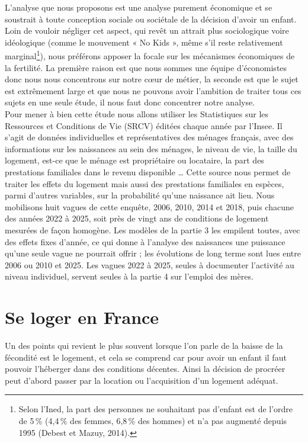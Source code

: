 \documentclass[12pt,a4paper]{article}
\begin{document}
\noindent L’analyse que nous proposons est une analyse purement économique et se soustrait à toute conception sociale ou sociétale de la décision d’avoir un enfant. Loin de vouloir négliger cet aspect, qui revêt un attrait plus sociologique voire idéologique (comme le mouvement « No Kids », même s’il reste relativement marginal\footnote{Selon l’Ined, la part des personnes ne souhaitant pas d’enfant est de l’ordre de 5\,\% (4,4\,\% des femmes, 6,8\,\% des hommes) et n’a pas augmenté depuis 1995 (Debest et Mazuy, 2014).}), nous préférons apposer la focale sur les mécanismes économiques de la fertilité. La première raison est que nous sommes une équipe d’économistes donc nous nous concentrons sur notre cœur de métier, la seconde est que le sujet est extrêmement large et que nous ne pouvons avoir l’ambition de traiter tous ces sujets en une seule étude, il nous faut donc concentrer notre analyse. \\

\noindent Pour mener à bien cette étude nous allons utiliser les Statistiques sur les Ressources et Conditions de Vie (SRCV) éditées chaque année par l’Insee. Il s’agit de données individuelles et représentatives des ménages français, avec des informations sur les naissances au sein des ménages, le niveau de vie, la taille du logement, est-ce que le ménage est propriétaire ou locataire, la part des prestations familiales dans le revenu disponible … Cette source nous permet de traiter les effets du logement mais aussi des prestations familiales en espèces, parmi d’autres variables, sur la probabilité qu’une naissance ait lieu. Nous mobilisons huit vagues de cette enquête, 2006, 2010, 2014 et 2018, puis chacune des années 2022 à 2025, soit près de vingt ans de conditions de logement mesurées de façon homogène. Les modèles de la partie 3 les empilent toutes, avec des effets fixes d’année, ce qui donne à l’analyse des naissances une puissance qu’une seule vague ne pourrait offrir ; les évolutions de long terme sont lues entre 2006 ou 2010 et 2025. Les vagues 2022 à 2025, seules à documenter l’activité au niveau individuel, servent seules à la partie 4 sur l’emploi des mères. 
	
	\section{Se loger en France}
	
Un des points qui revient le plus souvent lorsque l’on parle de la baisse de la fécondité est le logement, et cela se comprend car pour avoir un enfant il faut pouvoir l’héberger dans des conditions décentes. Ainsi la décision de procréer peut d’abord passer par la location ou l’acquisition d’un logement adéquat. \\
\end{document}
